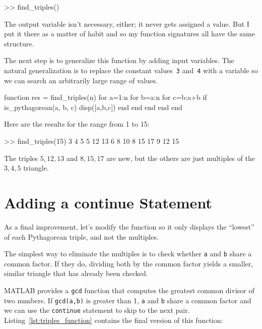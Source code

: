 \begin{code}
>> find_triples()
\end{code}

The output variable isn't necessary, either; it
never gets assigned a value.  But I put it there as a matter of
habit and so my function signatures all have the same structure.


The next step is to generalize this function by adding input
variables.  The natural generalization is to replace the constant
values~\lstinline{3} and~\lstinline{4} with a variable so we can search an arbitrarily large
range of values.

\begin{code}
function res = find_triples(n)
    for a=1:n
        for b=a:n
            for c=b:a+b
                if is_pythagorean(a, b, c)
                    disp([a,b,c])
                end
            end
        end
    end
end
\end{code}

Here are the results for the range from 1 to 15:

\begin{code}
>> find_triples(15)
     3     4     5
     5    12    13
     6     8    10
     8    15    17
     9    12    15
\end{code}

The triples $5,12,13$ and $8,15,17$ are new, but the others are just multiples of the $3,4,5$ triangle.

\section{Adding a continue Statement}


As a final improvement, let's modify the function so it only
displays the ``lowest'' of each Pythagorean triple, and not the
multiples.

The simplest way to eliminate the multiples is to check whether
\lstinline{a} and \lstinline{b} share a common factor.  If they do, dividing both
by the common factor yields a smaller, similar triangle that has
already been checked.


MATLAB provides a \lstinline{gcd} function that computes the greatest common
divisor of two numbers.  If \lstinline{gcd(a,b)} is greater than 1,
\lstinline{a} and \lstinline{b} share a common factor and we can use the \lstinline{continue}
statement to skip to the next pair. Listing~\ref{lst:triples_function} contains the final version of this function:

